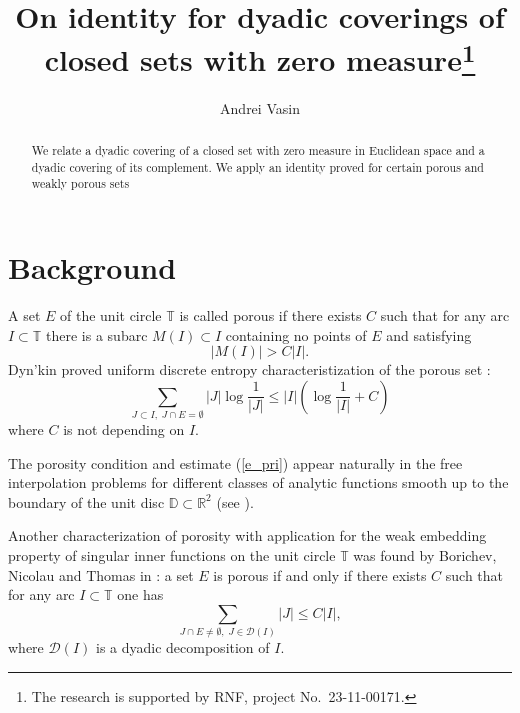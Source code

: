 \documentclass[12pt]{llncs}
\begin{document}
\fi
%
\title{On identity for dyadic coverings of closed sets with zero measure\thanks{The research is supported by RNF, project No.~23-11-00171.}}
\author{Andrei Vasin 
}


\maketitle

\begin{abstract}
We relate a dyadic covering of a closed  set  with zero measure in Euclidean space and a  dyadic covering of its complement. We apply an identity proved for certain porous and weakly porous sets

\end{abstract}

\section{Background}


A set $E$ of the unit circle $\mathbb{T} $ is called porous if there exists $C$ such that for any arc  $I\subset\mathbb{T}$ there
is  a subarc $M(I)\subset I$ containing no points of $E$ and satisfying
\[
|M(I)|> C | I|.
\]
  Dyn'kin proved  uniform  discrete entropy characteristization of the porous set \cite{D}:
\begin{equation}\label{e_pri}
 \sum_{J \subset I,\;J\cap E=\emptyset}|J| \log \frac{1}{|J|}\leq |I|\left( \log \frac{1}{|I|} + C\right)
\end{equation}
where $C$ is not depending on $I$. 



The porosity condition  and estimate (\ref{e_pri})  appear naturally
in the free interpolation problems for different classes of analytic functions
smooth up to the boundary of the unit disc $\mathbb{D} \subset \mathbb{R}^2$ (see \cite{D}).

Another characterization of porosity with application  for the  weak embedding property  of singular inner functions  on the unit circle $\mathbb{T}$  was found  by Borichev, Nicolau and Thomas in \cite[Lemma7]{BNT}: a set $E$ is porous if and only if there exists $C$ such that  for  any arc $I \subset \mathbb{T}$ one has
\begin{equation}\label{e_prdya}
\sum_{J \cap E \neq \emptyset,\; J \in \mathcal{D}(I)}|J|\leq C |I|,
\end{equation}
 where $\mathcal{D}(I)$ is a dyadic decomposition  of $I$.
\end{document}
